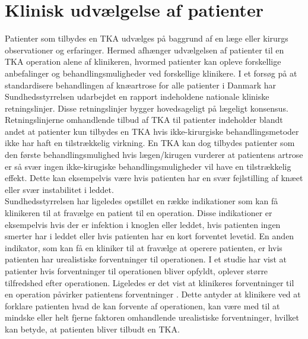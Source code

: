 \section{Klinisk udvælgelse af patienter}
Patienter som tilbydes en TKA udvælges på baggrund af en læge eller kirurgs observationer og erfaringer.
Hermed afhænger udvælgelsen af patienter til en TKA operation alene af klinikeren, hvormed patienter kan opleve forskellige anbefalinger og behandlingsmuligheder ved forskellige klinikere. I et forsøg på at standardisere behandlingen af knæartrose for alle patienter i Danmark har Sundhedsstyrrelsen udarbejdet en rapport indeholdene nationale kliniske retningslinjer. Disse retningslinjer bygger hovedsageligt på lægeligt konsensus. Retningslinjerne omhandlende tilbud af TKA til patienter indeholder blandt andet at patienter kun tilbydes en TKA hvis ikke-kirurgiske behandlingsmetoder ikke har haft en tilstrækkelig virkning. En TKA kan dog tilbydes patienter som den første behandlingsmulighed hvis lægen/kirugen vurderer at patientens artrose er så svær ingen ikke-kirugiske behandlingsmuligheder vil have en tilstrækkelig effekt. Dette kan eksempelvis være hvis patienten har en svær fejlstilling af knæet eller svær instabilitet i leddet. \citep{brostrom2012} \\
Sundhedsstyrrelsen har ligeledes opstillet en række indikationer som kan få klinikeren til at fravælge en patient til en operation. Disse indikationer er eksempelvis hvis der er infektion i knoglen eller leddet, hvis patienten ingen smerter har i leddet eller hvis patienten har en kort forventet levetid. En anden indikator, som kan få en kliniker til at fravælge at operere patienten, er hvis patienten har urealistiske forventninger til operationen. \citep{brostrom2012} I et studie har \cite{tejada2010} vist at patienter hvis forventninger til operationen bliver opfyldt, oplever større tilfredshed efter operationen. Ligeledes er det vist at klinikeres forventninger til en operation påvirker patientens forventninger \citep{tejada2010}. Dette antyder at klinikere ved at forklare patienten hvad de kan forvente af operationen, kan være med til at mindske eller helt fjerne faktoren omhandlende urealistiske forventninger, hvilket kan betyde, at patienten bliver tilbudt en TKA. \\
